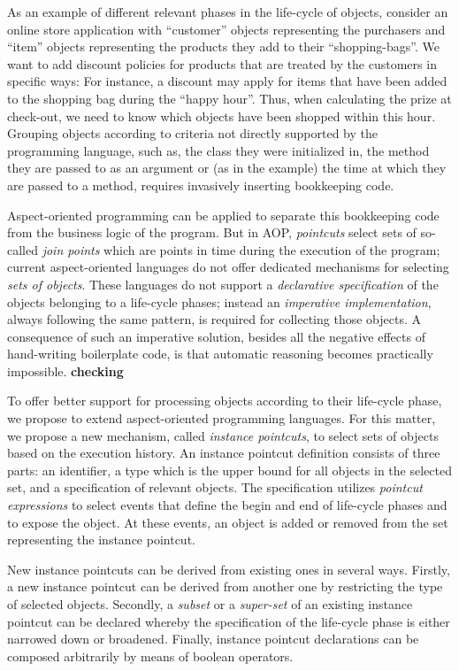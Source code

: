 As an example of different relevant phases in the life-cycle of objects, consider an online store application with ``customer'' objects representing the purchasers and ``item'' objects representing the products they add to their ``shopping-bags''. We want to add discount policies for products that are treated by the customers in specific ways: For instance, a discount may apply for items that have been added to the shopping bag during the ``happy hour''. Thus, when calculating the prize at check-out, we need to know which objects have been shopped within this hour.
Grouping objects according to criteria not directly supported by the programming language, such as, the class they were initialized in, the method they are passed to as an argument or (as in the example) the time at which they are passed to a method, requires invasively inserting bookkeeping code.

Aspect-oriented programming can be applied to separate this bookkeeping code from the business logic of the program. But in AOP, \emph{pointcuts} select sets of so-called \emph{join points} which are points in time during the execution of the program; current aspect-oriented languages do not offer dedicated mechanisms for selecting \emph{sets of objects}.
These languages do not support a \emph{declarative specification} of the objects belonging to a life-cycle phases; instead an \emph{imperative implementation}, always following the same pattern, is required for collecting those objects.
A consequence of such an imperative solution, besides all the negative effects of hand-writing boilerplate code, is that automatic reasoning becomes practically impossible. \textbf{checking}

To offer better support for processing objects according to their life-cycle phase, we propose to extend aspect-oriented programming languages.
For this matter, we propose a new mechanism, called \emph{instance pointcuts}, to select sets of objects based on the execution history.
An instance pointcut definition consists of three parts: an identifier, a type which is the upper bound for all objects in the selected set, and a specification of relevant objects.
The specification utilizes \emph{pointcut expressions} to select events that define the begin and end of life-cycle phases and to expose the object. At these events, an object is added or removed from the set representing the instance pointcut.

New instance pointcuts can be derived from existing ones in several ways. Firstly, a new instance pointcut can be derived from another one by restricting the type of selected objects. Secondly, a \emph{subset} or a \emph{super-set} of an existing instance pointcut can be declared whereby the specification of the life-cycle phase is either narrowed down or broadened. Finally, instance pointcut declarations can be composed arbitrarily by means of boolean operators.


